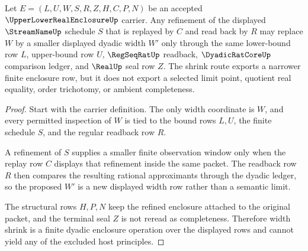\begin{theorem}
\label{thm:upper-lower-real-enclosure-width-shrink}
Let $E=(L,U,W,S,R,Z,H,C,P,N)$ be an accepted $\UpperLowerRealEnclosureUp$ carrier. Any refinement of the displayed $\StreamNameUp$ schedule $S$ that is replayed by $C$ and read back by $R$ may replace $W$ by a smaller displayed dyadic width $W'$ only through the same lower-bound row $L$, upper-bound row $U$, $\RegSeqRatUp$ readback, $\DyadicRatCoreUp$ comparison ledger, and $\RealUp$ seal row $Z$. The shrink route exports a narrower finite enclosure row, but it does not export a selected limit point, quotient real equality, order trichotomy, or ambient completeness.
\end{theorem}
\begin{proof}
Start with the carrier definition. The only width coordinate is $W$, and every permitted inspection of $W$ is tied to the bound rows $L,U$, the finite schedule $S$, and the regular readback row $R$.

A refinement of $S$ supplies a smaller finite observation window only when the replay row $C$ displays that refinement inside the same packet. The readback row $R$ then compares the resulting rational approximants through the dyadic ledger, so the proposed $W'$ is a new displayed width row rather than a semantic limit.

The structural rows $H,P,N$ keep the refined enclosure attached to the original packet, and the terminal seal $Z$ is not reread as completeness. Therefore width shrink is a finite dyadic enclosure operation over the displayed rows and cannot yield any of the excluded host principles.
\end{proof}

